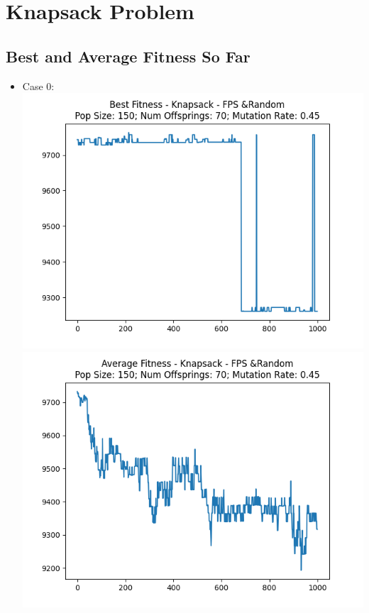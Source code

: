 \documentclass[12pt]{report} %
\begin{document}
\newpage


\section{Knapsack Problem}

\subsection{Best and Average Fitness So Far}

\begin{itemize}

	\item Case 0:\\
	      \includegraphics[scale=0.5]{../Analysis/BSF_Knapsack_0_4_150_70.png}
	      \includegraphics[scale=0.5]{../Analysis/ASF_Knapsack_0_4_150_70.png}

\end{itemize}
\end{document}
